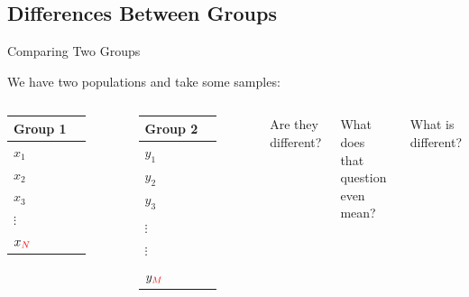 \subsection{Differences Between Groups}

\begin{frame}{Comparing Two Groups}

  We have two populations and take some samples: \\
  \begin{columns}[T]
      \begin{tabular}{ll}
        Group 1 \\ \hline
        $x_1$  \\
        $x_2$  \\
        $x_3$  \\
        $\vdots$ \\
        $x_{{\color{red}N}}$  \\
      \end{tabular}


    \vfill
    \begin{tabular}{ll}
      Group 2 \\ \hline
      $y_1$ \\
      $y_2$ \\
      $y_3$ \\
      \\
      $\vdots$ \\
      $\vdots$ \\
      \\
      $y_{{\color{red}M}}$ \\
    \end{tabular}



    \vfill

    Are they different? 

    \vfill

    What does that question even mean? 

    \vfill

    What is different?

    \vfill

  \end{columns}


\end{frame}

